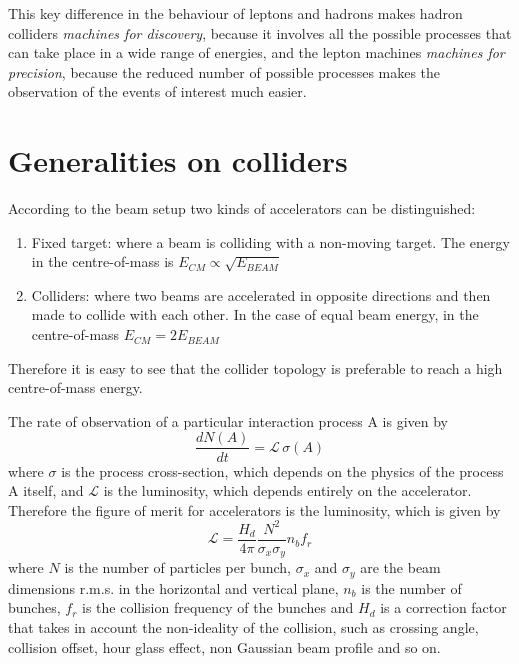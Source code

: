 This key difference in the behaviour of leptons and hadrons makes hadron colliders \textit{machines for discovery}, because it involves all the possible processes that can take place in a wide range of energies, and the lepton machines \textit{machines for precision}, because the reduced number of possible processes makes the observation of the events of interest much easier.

\section{Generalities on colliders}

According to the beam setup two kinds of accelerators can be distinguished: 
\begin{enumerate}
\item Fixed target: where a beam is colliding with a non-moving target. The energy in the centre-of-mass is $E_{CM} \propto \sqrt{E_{BEAM}}$
\item Colliders: where two beams are accelerated in opposite directions and then made to collide with each other. In the case of equal beam energy, in the centre-of-mass $E_{CM} = 2 E_{BEAM}$
\end{enumerate}
Therefore it is easy to see that the collider topology is preferable to reach a high centre-of-mass energy.

The rate of observation of a particular interaction process A is given by
\begin{equation}
\frac{dN(A)}{dt} = \mathscr{L} \, \sigma(A)
\end{equation}
where $\sigma$ is the process cross-section, which depends on the physics of the process A itself, and $\mathscr{L}$ is the luminosity, which depends entirely on the accelerator.
Therefore the figure of merit for accelerators is the luminosity, which is given by
\begin{equation}
\mathscr{L} = \frac{H_d}{4\pi} \frac{N^2}{\sigma_x \sigma_y} n_b f_r
\end{equation}
where $N$ is the number of particles per bunch, $\sigma_x$ and $\sigma_y$ are the beam dimensions r.m.s. in the horizontal and vertical plane, $n_b$ is the number of bunches, $f_r$ is the collision frequency of the bunches and $H_d$ is a correction factor that takes in account the non-ideality of the collision, such as crossing angle, collision offset, hour glass effect, non Gaussian beam profile and so on.

